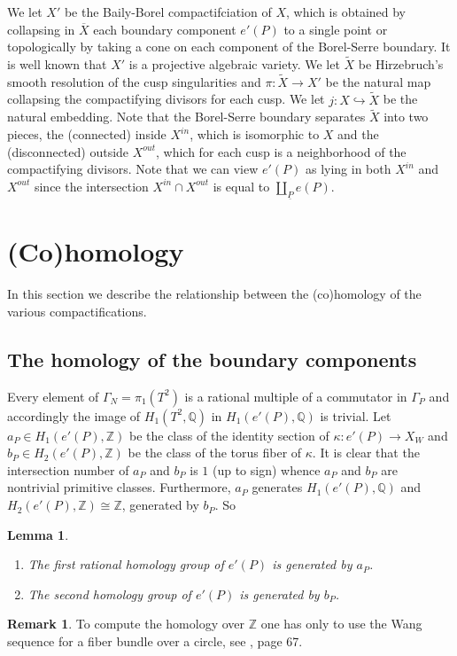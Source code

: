 \documentclass[12pt,leqno]{amsart}
\numberwithin{equation}{section}
\theoremstyle{plain}
\newtheorem{lemma}[theorem]{Lemma}
\theoremstyle{definition}
\newtheorem{remark}[theorem]{Remark}
\theoremstyle{remark}
\newcommand{\Q}{\mathbb{Q}}
\newcommand{\Z}{\mathbb{Z}}
\begin{document}
We let $X'$ be the Baily-Borel compactifciation of $X$, which is obtained by collapsing in $\overline{X}$ each boundary component $e'(P)$ to a single point or topologically by taking a cone on each component of the Borel-Serre boundary. It is well known that $X'$ is a projective algebraic variety. We let $\tilde{X}$ be Hirzebruch's smooth resolution of the cusp singularities and $\pi:\tilde{X} \to X'$ be the natural map collapsing the compactifying divisors for each cusp. We let $j:X \hookrightarrow \tilde{X}$ be the natural embedding. Note that the Borel-Serre boundary separates $\tilde{X}$ into two pieces, the (connected) inside $X^{in}$, which is isomorphic to $X$ and the (disconnected) outside $X^{out}$, which for each cusp is a neighborhood of the compactifying divisors. Note that we can view $e'(P)$ as lying in both $X^{in}$ and $X^{out}$ since the intersection $X^{in} \cap X^{out}$ is equal to $ \coprod_{\underline{P}} e({P})$. 




\section{(Co)homology}

In this section we describe the relationship between the (co)homology of the various
compactifications. 

\subsection{The homology of the boundary components}\label{boundaryhom}


Every element of $\Gamma_N =\pi_1(T^2)$ is a rational multiple of a commutator in $\Gamma_P$ and accordingly the image of $H_1(T^2,\Q)$ in $H_1(e'(P),\Q)$ is trivial.
Let $a_P \in H_1(e'(P),\Z)$ be the class of the identity section of $\kappa:e'(P) \to X_W$ and $b_P \in H_2(e'(P),\Z)$ be the class of the torus fiber of $\kappa$. It is clear that the intersection number of $a_P$ and $b_P$ is $1$ (up to sign) whence $a_P$ and $b_P$ are nontrivial primitive classes. Furthermore, $a_P$ generates $H_1(e'(P),\Q)$ and $ H_2(e'(P),\Z)  \cong \Z$, generated by $b_P$. So

\begin{lemma}\label{ePhomology}

\begin{enumerate}
\item[(i)] The first rational homology group of $e'(P)$ is generated by $a_P$.
\item[(ii)] The second homology group of $e'(P)$ is generated by $b_P$.
\end{enumerate}
\end{lemma}
\begin{remark} To compute the homology over $\Z$ one has only to use the Wang sequence for a fiber bundle over a circle, see \cite{Milnor}, page 67.
\end{remark}
\end{document}
